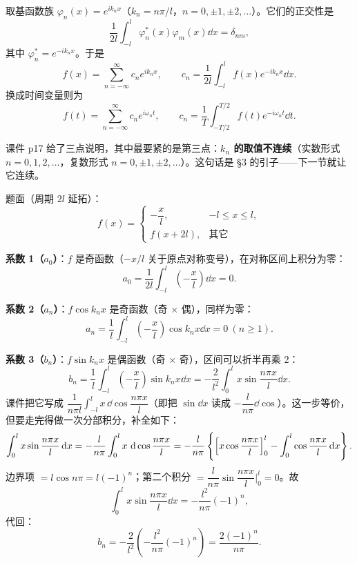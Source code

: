\documentclass[11pt]{ctexart}
\begin{document}

取基函数族 $\varphi_n(x)=e^{ik_nx}$（$k_n=n\pi/l$，$n=0,\pm1,\pm2,\dots$）。它们的正交性是
\[ \frac{1}{2l}\int_{-l}^{l}\varphi_n^{*}(x)\varphi_m(x)\dd x=\delta_{nm} ,\]
其中 $\varphi_n^*=e^{-ik_nx}$。于是
\[ f(x)=\sum_{n=-\infty}^{\infty}c_ne^{ik_nx},\qquad c_n=\frac{1}{2l}\int_{-l}^{l}f(x)e^{-ik_nx}\dd x .\]
换成时间变量则为
\[ f(t)=\sum_{n=-\infty}^{\infty}c_ne^{i\omega_nt},\qquad c_n=\frac{1}{T}\int_{-T/2}^{T/2}f(t)e^{-i\omega_nt}\dd t .\]


课件 p17 给了三点说明，其中最要紧的是第三点：\textbf{$k_n$ 的取值不连续}（实数形式 $n=0,1,2,\dots$，复数形式 $n=0,\pm1,\pm2,\dots$）。这句话是 §3 的引子——下一节就让它连续。


题面（周期 $2l$ 延拓）：
\[
f(x)=\begin{cases}-\dfrac{x}{l}, & -l\le x\le l,\\[4pt] f(x+2l), & \text{其它}\end{cases}
\]

\textbf{系数 1（$a_0$）}：$f$ 是奇函数（$-x/l$ 关于原点对称变号），在对称区间上积分为零：
\[ a_0=\frac{1}{2l}\int_{-l}^{l}\left(-\frac{x}{l}\right)\dd x=0 .\]

\textbf{系数 2（$a_n$）}：$f\cos k_nx$ 是奇函数（奇 $\times$ 偶），同样为零：
\[ a_n=\frac{1}{l}\int_{-l}^{l}\left(-\frac{x}{l}\right)\cos k_nx\dd x=0\ (n\ge1) .\]

\textbf{系数 3（$b_n$）}：$f\sin k_nx$ 是偶函数（奇 $\times$ 奇），区间可以折半再乘 2：
\[
b_n=\frac{1}{l}\int_{-l}^{l}\left(-\frac{x}{l}\right)\sin k_nx\dd x
=-\frac{2}{l^{2}}\int_{0}^{l}x\sin\frac{n\pi x}{l}\dd x .
\]
课件把它写成 $\dfrac{1}{n\pi l}\int_{-l}^{l}x\,\dd\cos\dfrac{n\pi x}{l}$（即把 $\sin\dd x$ 读成 $-\dfrac{l}{n\pi}\dd\cos$）。这一步等价，但要走完得做一次分部积分，补全如下：
\[
\int_0^{l}x\sin\frac{n\pi x}{l}\,\mathrm{d} x
=-\frac{l}{n\pi}\int_0^{l}x\,\,\mathrm{d}\cos\frac{n\pi x}{l}
=-\frac{l}{n\pi}\left\{\Bigl[x\cos\frac{n\pi x}{l}\Bigr]_0^{l}-\int_0^{l}\cos\frac{n\pi x}{l}\,\mathrm{d} x\right\} .
\]
边界项 $=l\cos n\pi=l(-1)^n$；第二个积分 $=\dfrac{l}{n\pi}\sin\dfrac{n\pi x}{l}\Big|_0^l=0$。故
\[ \int_0^{l}x\sin\frac{n\pi x}{l}\dd x=-\frac{l^{2}}{n\pi}(-1)^n ,\]
代回：
\[ b_n=-\frac{2}{l^{2}}\left(-\frac{l^{2}}{n\pi}(-1)^n\right)=\frac{2(-1)^n}{n\pi} .\]
\end{document}
